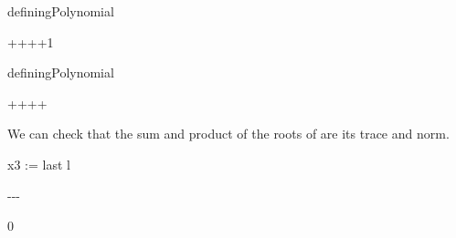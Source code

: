 {{{{{{{{{{{\begin{xtc}
\begin{spadsrc}
definingPolynomial %
\end{spadsrc}
\begin{TeXOutput}
\begin{fricasmath}{4}
+\TIMES {}+\TIMES {}++1%
\end{fricasmath}
\end{TeXOutput}
\end{xtc}
\begin{xtc}
\begin{xtccomment}
\end{xtccomment}
\begin{spadsrc}
definingPolynomial %
\end{spadsrc}
\begin{TeXOutput}
\begin{fricasmath}{5}
+\TIMES {}++\TIMES {}+%
\end{fricasmath}
\end{TeXOutput}
\end{xtc}
\begin{xtc}
\begin{xtccomment}
We can check that the sum and product of the roots of  are
its trace and norm.
\end{xtccomment}
\begin{spadsrc}
x3 := last l 
\end{spadsrc}
\begin{TeXOutput}
\begin{fricasmath}{6}
-{}-{}-{}%
\end{fricasmath}
\end{TeXOutput}
\end{xtc}
\begin{xtc}
\begin{xtccomment}
\end{xtccomment}
\begin{spadsrc}
\end{spadsrc}
\begin{TeXOutput}
\begin{fricasmath}{7}
0%
\end{fricasmath}

\end{TeXOutput}
\end{xtc}}}}}}}}}}}}
